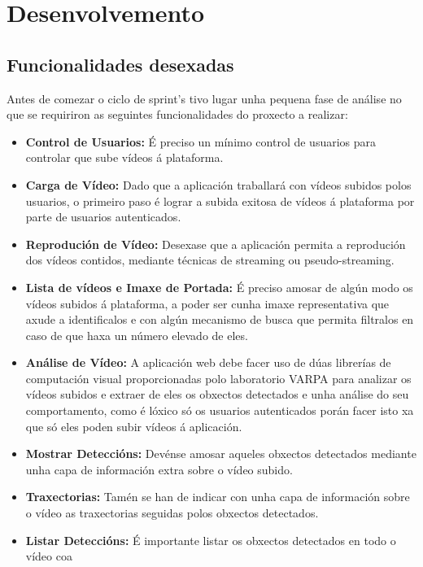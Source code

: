 \chapter{Desenvolvemento}
\label{cap:desenvolvemento}

\section{Funcionalidades desexadas}
    Antes de comezar o ciclo de sprint's tivo lugar unha pequena fase de análise no que se 
    requiriron as seguintes funcionalidades do proxecto a realizar:
    \begin{itemize}
     \item \textbf{Control de Usuarios:} É preciso un mínimo control de usuarios para controlar que
        sube vídeos á plataforma.
     \item \textbf{Carga de Vídeo:} Dado que a aplicación traballará con vídeos subidos polos 
        usuarios, o primeiro paso é lograr a subida exitosa de vídeos á plataforma por parte de
        usuarios autenticados.
     \item \textbf{Reprodución de Vídeo:} Desexase que a aplicación permita a reprodución dos vídeos
        contidos, mediante técnicas de streaming ou pseudo-streaming.
     \item \textbf{Lista de vídeos e Imaxe de Portada:} É preciso amosar de algún modo os vídeos 
        subidos á plataforma, a poder ser cunha imaxe representativa que axude a identificalos e con
        algún mecanismo de busca que permita filtralos en caso de que haxa un número elevado de eles.
     \item \textbf{Análise de Vídeo:} A aplicación web debe facer uso de dúas librerías de 
        computación visual proporcionadas polo laboratorio VARPA para analizar os vídeos subidos e
        extraer de eles os obxectos detectados e unha análise do seu comportamento, como é lóxico só
        os usuarios autenticados porán facer isto xa que só eles poden subir vídeos á aplicación.
     \item \textbf{Mostrar Deteccións:} Devénse amosar aqueles obxectos detectados mediante unha 
        capa de información extra sobre o vídeo subido. 
     \item \textbf{Traxectorias:} Tamén se han de indicar con unha capa de información sobre o vídeo
        as traxectorias seguidas polos obxectos detectados.
     \item \textbf{Listar Deteccións:} É importante listar os obxectos detectados en todo o vídeo coa

\end{itemize}
